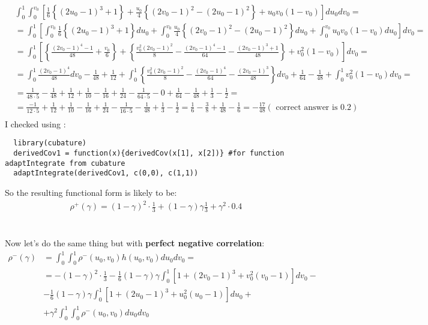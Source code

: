 \documentclass[]{article}
\begin{document}
	$$
	\begin{aligned}
    &\int_0^1 \int_0^{v_0}  \left[    \frac{1}{6}\left\{  (2u_0 - 1)^3 +1\right\} +  \frac{u_0}{4}\left\{  (2v_0 - 1)^2 -(2u_0 - 1)^2 \right\} + u_0 v_0 (1 - v_0)   \right] du_0  dv_0 = \\
    &= \int_0^1 \left[ \int_0^{v_0}      \frac{1}{6}\left\{  (2u_0 - 1)^3 +1\right\}du_0   +  \int_0^{v_0} \frac{u_0}{4}\left\{  (2v_0 - 1)^2 -(2u_0 - 1)^2 \right\} du_0  + \int_0^{v_0} u_0 v_0 (1 - v_0)  du_0  \right]  dv_0 = \\
    &= \int_0^1 \left[    \left\{ \frac{(2v_0 - 1)^4 - 1}{48}  + \frac{v_0}{6} \right\}   +      \left\{   \frac{v_0^2(2v_0 - 1)^2}{8}     -\frac{(2v_0 - 1)^4 - 1}{64} - \frac{(2v_0 - 1)^3 + 1}{48}     \right\}   + v_0^2 (1 - v_0)    \right]  dv_0 = \\
    &= \int_0^1   \frac{(2v_0 - 1)^4}{48} dv_0 - \frac{1}{48}  + \frac{1}{12}     +      \int_0^1    \left\{   \frac{v_0^2(2v_0 - 1)^2}{8}     -\frac{(2v_0 - 1)^4}{64} - \frac{(2v_0 - 1)^3}{48}     \right\}dv_0  + \frac{1}{64} -  \frac{1}{48}  + \int_0^1 v_0^2 (1 - v_0)    dv_0=\\
    &=  \frac{1}{48 \cdot 5}- \frac{1}{48}  + \frac{1}{12}     +     \frac{1}{10}  - \frac{1}{16} + \frac{1}{24}         -\frac{1}{64\cdot 5} - 0       + \frac{1}{64} -  \frac{1}{48}  + \frac{1}{3} - \frac{1}{2}=\\
    &=  \frac{-1}{12 \cdot 5}  + \frac{1}{12}     +     \frac{1}{10}  - \frac{1}{16} + \frac{1}{24}         -\frac{1}{16\cdot 5}  -  \frac{1}{48}  + \frac{1}{3} - \frac{1}{2}  =   \frac{1}{6}  - \frac{3}{8} + \frac{1}{48}  - \frac{1}{6} = -\frac{17}{48} (\text{ correct answer is } 0.2)\\
  \end{aligned}
	$$
I checked using :

{\tiny
{\begin{verbatim}
  library(cubature)
  derivedCov1 = function(x){derivedCov(x[1], x[2])} #for function adaptIntegrate from cubature
  adaptIntegrate(derivedCov1, c(0,0), c(1,1))
\end{verbatim}
}}

So the resulting functional form is likely to be:
	$$
	\begin{aligned}
    \rho^+(\gamma) = (1-\gamma)^2\cdot \frac{1}{3} + (1-\gamma)\gamma \frac{1}{3} +\gamma^2 \cdot 0.4
	\end{aligned}
	$$
~\\
~\\
Now let's do the same thing but with \textbf{perfect negative correlation}:
	$$
	\begin{aligned}
    \rho^-(\gamma) &= \int_0^1 \int_0^1 \rho^-(u_0, v_0) h(u_0, v_0) du_0 dv_0= \\
       &= -(1-\gamma)^2\cdot \frac{1}{3}  -\frac{1}{6}(1-\gamma)\gamma \int_0^1 \left[      1 + (2v_0 - 1)^3   +   v_0^2 (v_0 - 1)  \right] dv_0 - \\
       &-\frac{1}{6}(1-\gamma)\gamma \int_0^1 \left[      1 + (2u_0 - 1)^3   +   u_0^2 (u_0 - 1)  \right] du_0  + \\
       &+\gamma^2\int_0^1 \int_0^1 \rho^-(u_0, v_0) du_0 dv_0
	\end{aligned}
	$$
\end{document}
